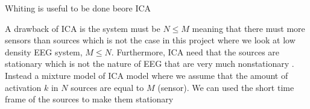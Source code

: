 Whiting is useful to be done beore ICA

A drawback of ICA is the system must be $N \leq M$ meaning that there must more sensors than sources which is not the case in this project where we look at low density EEG system, $M \leq N$. Furthermore, ICA need that the sources are stationary which is not the nature of EEG that are very much nonstationary \cite[p. 7-8]{PHD}.
\\
Instead a mixture model of ICA model where we assume that the amount of activation $k$ in $N$ sources are equal to $M$ (sensor). We can used the short time frame of the sources to make them stationary
